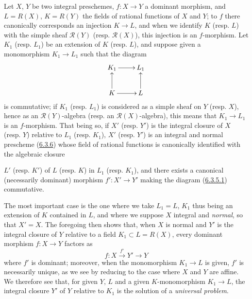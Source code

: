 \begin{env}[6.3.9]
\label{II.6.3.9}
Let $X$, $Y$ be two integral preschemes, $f:X\to Y$ a dominant morphism, and
$L=R(X)$, $K=R(Y)$ the fields of rational functions of $X$ and $Y$; to $f$
there canonically corresponds an injection $K\to L$, and when we identify
$K$ (resp. $L$) with the simple sheaf $\mathcal{R}(Y)$ (resp.
$\mathcal{R}(X)$), this injection is an $f$-morphism. Let $K_1$ (resp.
$L_1$) be an extension of $K$ (resp. $L$), and suppose given a monomorphism
$K_1\to L_1$ such that the diagram
\[
\xymatrix{
K_1\ar[r]&L_1\\
K\ar[u]\ar[r]&L\ar[u]
}
\]
is commutative; if $K_1$ (resp. $L_1$) is considered as a simple sheaf on $Y$
(resp. $X$), hence as an $\mathcal{R}(Y)$-algebra (resp. an
$\mathcal{R}(X)$-algebra), this means that $K_1\to L_1$ is an
$f$-morphism. That being so, if $X'$ (resp. $Y'$) is the integral closure of
$X$ (resp. $Y$) relative to $L_1$ (resp. $K_1$), $X'$ (resp. $Y'$) is an
integral and normal prescheme (\hyperref[II.6.3.6]{6.3.6}) whose field of
rational functions is canonically identified with the algebraic closure


$L'$ (resp. $K'$) of $L$ (resp. $K$) in $L_1$ (resp. $K_1$), and there exists
a canonical (necessarily dominant) morphism $f':X'\to Y'$ making the diagram
(\hyperref[II.6.3.5.1]{6.3.5.1}) commutative.

The most important case is the one where we take $L_1=L$, $K_1$ thus being
an extension of $K$ contained in $L$, and where we suppose $X$ integral and
\emph{normal}, so that $X'=X$. The foregoing then shows that, when $X$ is
normal and $Y'$ is the integral closure of $Y$ relative to a field
$K_1\subset L=R(X)$, every dominant morphism $f:X\to Y$ factors as
\[
f:X\xrightarrow{f'}Y'\to Y
\]
where $f'$ is dominant; moreover, when the monomorphism $K_1\to L$ is given,
$f'$ is necessarily unique, as we see by reducing to the case where $X$ and
$Y$ are affine. We therefore see that, for given $Y$, $L$ and a given
$K$-monomorphism $K_1\to L$, the integral closure $Y'$ of $Y$ relative to
$K_1$ is the solution of a \emph{universal problem}.
\end{env}

